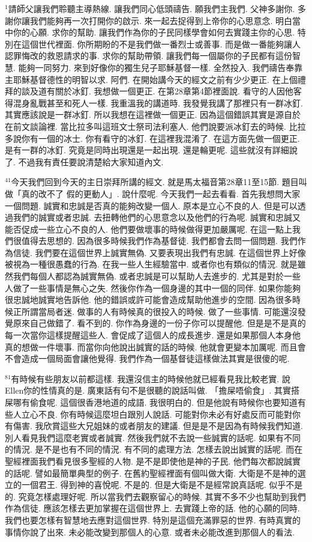 \documentclass{book}
\begin{document}
$^{1}$請師父讓我們聆聽主導熱線.
讓我們同心低頭禱告.
願我們主我們.
父神多謝你.
多謝你讓我們能夠再一次打開你的啟示.
來一起去捉得到上帝你的心思意念.
明白當中你的心願.
求你的幫助.
讓我們作為你的子民同樣學會如何去實踐主你的心思.
特別在這個世代裡面.
你所期盼的不是我們做一番烈士或善事.
而是做一番能夠讓人認罪悔改的救恩請求的事.
求你的幫助帶領.
讓我們每一個屬你的子民都有這份智慧.
能夠一同努力.
來到好像你的獨生兒子耶穌基督一樣.
全然投入.
我們禱告奉靠主耶穌基督德性的明智以求.
阿們.
在開始講今天的經文之前有少少更正.
在上個禮拜的談及道有關於冰釘.
我想做一個更正.
在第28章第4節裡面說.
看守的人因他客得混身亂戰甚至和死人一樣.
我重溫我的講道時.
我發覺我講了那裡只有一群冰釘.
其實應該說是一群冰釘.
所以我想在這裡做一個更正.
因為這個錯誤其實是源自於在前文談論裡.
當比拉多叫這班文士祭司法利塞人.
他們說要派冰釘去的時候.
比拉多說你有一個的冰士.
你有看守的冰釘.
在這裡我混淆了.
在這方面先做一個更正.
是有一群的冰釘.
究竟是同時出現還是一起出現.
還是輪更呢.
這些就沒有詳細說了.
不過我有責任要說清楚給大家知道內文.

$^{41}$今天我們回到今天的主日崇拜所講的經文.
就是馬太福音第28章11至15節.
題目叫做「真的改不了 假的更動人」.
說什麼呢.
今天我們一起去看看.
首先我想問大家一個問題.
誠實和忠誠是否真的能夠改變一個人.
原本是立心不良的人.
但是可以透過我們的誠實或者忠誠.
去扭轉他們的心思意念以及他們的行為呢.
誠實和忠誠又能否促成一些立心不良的人.
他們要做壞事的時候做得更加嚴厲呢.
在這一點上我們很值得去思想的.
因為很多時候我們作為基督徒.
我們都會去問一個問題.
我們作為信徒.
我們要在這個世界上誠實無偽.
又要表現出我們有忠誠.
在這個世界上好像被視為一種很愚蠢的行為.
在我一些人生經驗當中.
或者你也有類似的情況.
就是雖然我們每個人都認為誠實無偽.
或者忠誠是可以幫助人去進步的.
尤其是對於一些人做了一些事情是無心之失.
然後你作為一個身邊的其中一個的同伴.
如果你能夠很忠誠地誠實地告訴他.
他的錯誤或許可能會造成幫助他進步的空間.
因為很多時候正所謂當局者迷.
做事的人有時候真的很投入的時候.
做了一些事情.
可能還沒發覺原來自己做錯了.
看不到的.
你作為身邊的一份子你可以提醒他.
但是是不是真的每一次當你這樣提醒這些人.
會促成了這個人的成長進步.
還是如果那個人本身他真的想做一件壞事.
而當你向他說出誠實的話的時候.
他就會更變本加厲呢.
而且會不會造成一個局面會讓他覺得.
我們作為一個基督徒這樣做法其實是很傻的呢.

$^{81}$有時候有些朋友以前都這樣.
我還沒信主的時候他就已經看見我比較老實.
說Ellen你的性情真的是.
廣東話有句不是很聽的說話叫做.
「擔屎唔偷食」.
其實搭屎哪有偷食呢.
這個很香港地道的成語.
我很明白的.
但是他說有時候你也要知道有些人立心不良.
你有時候這麼坦白跟別人說話.
可能對你未必有好處反而可能對你有傷害.
我欣賞這些大兄姐妹的或者朋友的建議.
但是是不是因為有時候我們知道.
別人看見我們這麼老實或者誠實.
然後我們就不去說一些誠實的話呢.
如果有不同的情況.
是不是也有不同的情況.
有不同的處理方法.
怎樣去說出誠實的話呢.
而在聖經裡面我們看見很多聖經的人物.
是不是即使他是神的子民.
他們每次都說誠實的話呢.
譬如最簡單典型的例子.
在舊約聖經裡面有個叫做大衛.
大衛是不是神的選立的一個君王.
得到神的喜悅呢.
不是的.
但是大衛是不是經常說真話呢.
似乎不是的.
究竟怎樣處理好呢.
所以當我們去觀察留心的時候.
其實不多不少也幫助到我們作為信徒.
應該怎樣去更加掌握在這個世界上.
去實踐上帝的話.
他的心願的同時.
我們也要怎樣有智慧地去應對這個世界.
特別是這個充滿罪惡的世界.
有時真實的事情你說了出來.
未必能改變到那個人的心意.
或者未必能改進到那個人的看法.
\end{document}
